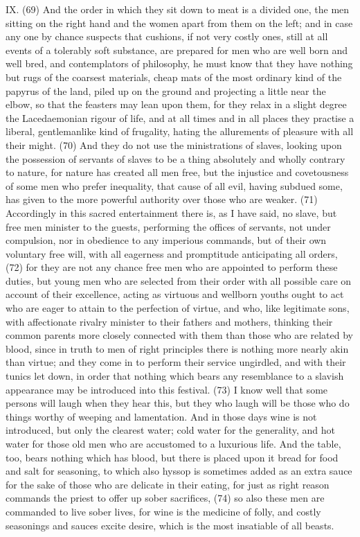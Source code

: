 IX. (69) And the order in which they sit down to meat is a divided one, the men sitting on the right
hand and the women apart from them on the left; and in case any one by chance suspects that
cushions, if not very costly ones, still at all events of a tolerably soft substance, are prepared for
men who are well born and well bred, and contemplators of philosophy, he must know that they
have nothing but rugs of the coarsest materials, cheap mats of the most ordinary kind of the
papyrus of the land, piled up on the ground and projecting a little near the elbow, so that the
feasters may lean upon them, for they relax in a slight degree the Lacedaemonian rigour of life,
and at all times and in all places they practise a liberal, gentlemanlike kind of frugality, hating the
allurements of pleasure with all their might. (70) And they do not use the ministrations of slaves,
looking upon the possession of servants of slaves to be a thing absolutely and wholly contrary to
nature, for nature has created all men free, but the injustice and covetousness of some men who
prefer inequality, that cause of all evil, having subdued some, has given to the more powerful
authority over those who are weaker. (71) Accordingly in this sacred entertainment there is, as I
have said, no slave, but free men minister to the guests, performing the offices of servants, not
under compulsion, nor in obedience to any imperious commands, but of their own voluntary free
will, with all eagerness and promptitude anticipating all orders, (72) for they are not any chance
free men who are appointed to perform these duties, but young men who are selected from their
order with all possible care on account of their excellence, acting as virtuous and wellborn youths
ought to act who are eager to attain to the perfection of virtue, and who, like legitimate sons, with
affectionate rivalry minister to their fathers and mothers, thinking their common parents more
closely connected with them than those who are related by blood, since in truth to men of right
principles there is nothing more nearly akin than virtue; and they come in to perform their service
ungirdled, and with their tunics let down, in order that nothing which bears any resemblance to a
slavish appearance may be introduced into this festival. (73) I know well that some persons will
laugh when they hear this, but they who laugh will be those who do things worthy of weeping and
lamentation. And in those days wine is not introduced, but only the clearest water; cold water for
the generality, and hot water for those old men who are accustomed to a luxurious life. And the
table, too, bears nothing which has blood, but there is placed upon it bread for food and salt for
seasoning, to which also hyssop is sometimes added as an extra sauce for the sake of those who
are delicate in their eating, for just as right reason commands the priest to offer up sober
sacrifices, (74) so also these men are commanded to live sober lives, for wine is the medicine of
folly, and costly seasonings and sauces excite desire, which is the most insatiable of all beasts.

